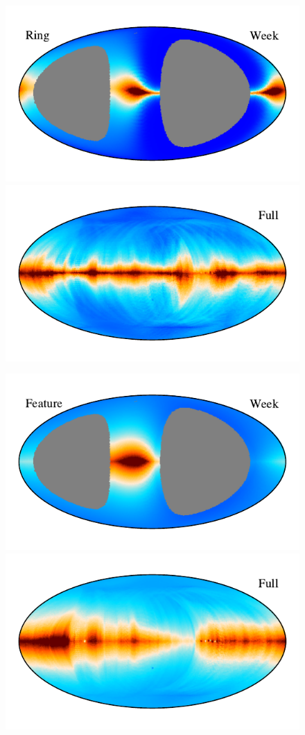 \documentclass{aa}
\begin{document}
\begin{figure}
    \vspace{-0.6cm}

    \includegraphics[width=0.88\columnwidth]{figs/zodi_comps/zodi_06_ring_week.pdf}\includegraphics[width=0.88\columnwidth]{figs/zodi_comps/zodi_06_ring_full.pdf}

    \vspace{-0.6cm}

    \includegraphics[width=0.88\columnwidth]{figs/zodi_comps/zodi_06_feature_week.pdf}\includegraphics[width=0.88\columnwidth]{figs/zodi_comps/zodi_06_feature_full.pdf}


\end{figure}
\end{document}
